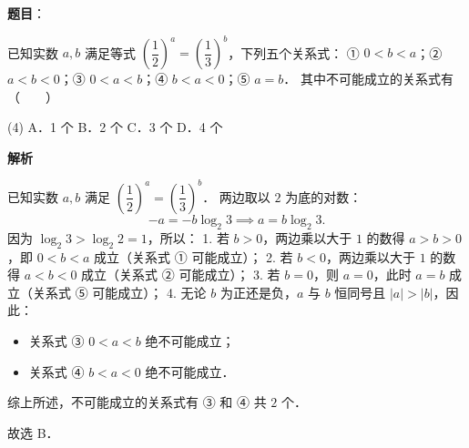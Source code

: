 \begin{answer}

\textbf{题目}：

已知实数 $a, b$ 满足等式 $\left(\dfrac{1}{2}\right)^a = \left(\dfrac{1}{3}\right)^b$，下列五个关系式：
① $0 < b < a$；② $a < b < 0$；③ $0 < a < b$；④ $b < a < 0$；⑤ $a = b$．
其中不可能成立的关系式有\mbox{（　　）}

\begin{gkopts}(4)
\task A．1 个
\task B．2 个
\task C．3 个
\task D．4 个
\end{gkopts}

\textbf{解析}

已知实数 $a, b$ 满足 $\left(\dfrac{1}{2}\right)^a = \left(\dfrac{1}{3}\right)^b$．
两边取以 $2$ 为底的对数：
\nopagebreak[4]
\[
-a = -b\log_2 3 \implies a = b\log_2 3.
\]
因为 $\log_2 3 > \log_2 2 = 1$，所以：
1. 若 $b > 0$，两边乘以大于 $1$ 的数得 $a > b > 0$，即 $0 < b < a$ 成立（关系式 ① 可能成立）；
2. 若 $b < 0$，两边乘以大于 $1$ 的数得 $a < b < 0$ 成立（关系式 ② 可能成立）；
3. 若 $b = 0$，则 $a = 0$，此时 $a = b$ 成立（关系式 ⑤ 可能成立）；
4. 无论 $b$ 为正还是负，$a$ 与 $b$ 恒同号且 $|a| > |b|$，因此：
\begin{itemize}
\item 关系式 ③ $0 < a < b$ 绝不可能成立；
\item 关系式 ④ $b < a < 0$ 绝不可能成立．
\end{itemize}
综上所述，不可能成立的关系式有 ③ 和 ④ 共 $2$ 个．

故选 B．


\end{answer}
